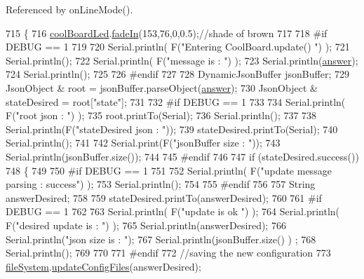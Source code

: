 Referenced by on\+Line\+Mode().


\begin{DoxyCode}
715 \{
716     \hyperlink{classCoolBoard_a1b1d3c684a5baa56b08486e192fd8e97}{coolBoardLed}.\hyperlink{classCoolBoardLed_ab778f5e7bed0ab74e3906d82110493c3}{fadeIn}(153,76,0,0.5);\textcolor{comment}{//shade of brown        }
717 
718 \textcolor{preprocessor}{#if DEBUG == 1}
719 
720     Serial.println( F(\textcolor{stringliteral}{"Entering CoolBoard.update() "}) );
721     Serial.println();
722     Serial.println( F(\textcolor{stringliteral}{"message is : "}) );
723     Serial.println(\hyperlink{classCoolBoard_a7b835fafd449e5282f7f91d787a2dc15}{answer});
724     Serial.println();
725 
726 \textcolor{preprocessor}{#endif}
727 
728     DynamicJsonBuffer jsonBuffer;
729     JsonObject & root = jsonBuffer.parseObject(\hyperlink{classCoolBoard_a7b835fafd449e5282f7f91d787a2dc15}{answer});
730     JsonObject & stateDesired = root[\textcolor{stringliteral}{"state"}];
731 
732 \textcolor{preprocessor}{#if DEBUG == 1}
733 
734     Serial.println( F(\textcolor{stringliteral}{"root json : "}) );
735     root.printTo(Serial);
736     Serial.println();
737 
738     Serial.println(F(\textcolor{stringliteral}{"stateDesired json : "}));
739     stateDesired.printTo(Serial);
740     Serial.println();
741     
742     Serial.print(F(\textcolor{stringliteral}{"jsonBuffer size : "}));
743     Serial.println(jsonBuffer.size());
744 
745 \textcolor{preprocessor}{#endif}
746 
747     \textcolor{keywordflow}{if} (stateDesired.success())
748     \{
749     
750 \textcolor{preprocessor}{    #if DEBUG == 1}
751 
752         Serial.println( F(\textcolor{stringliteral}{"update message parsing : success"}) );
753         Serial.println();
754     
755 \textcolor{preprocessor}{    #endif}
756 
757             String answerDesired;
758         
759             stateDesired.printTo(answerDesired);
760             
761 \textcolor{preprocessor}{        #if DEBUG == 1      }
762         
763             Serial.println( F(\textcolor{stringliteral}{"update is ok "}) );
764             Serial.println( F(\textcolor{stringliteral}{"desired update is : "}) );            
765             Serial.println(answerDesired);
766             Serial.println(\textcolor{stringliteral}{"json size is : "});
767             Serial.println(jsonBuffer.size() ) ;                
768             Serial.println();
769 
770         
771 \textcolor{preprocessor}{        #endif}
772             \textcolor{comment}{//saving the new configuration}
773             \hyperlink{classCoolBoard_a42c2586fbb13ff7f06538e9284e8538d}{fileSystem}.\hyperlink{classCoolFileSystem_adfa8e2e80641ae6f0cceabd348a9b841}{updateConfigFiles}(answerDesired);

\end{DoxyCode}
